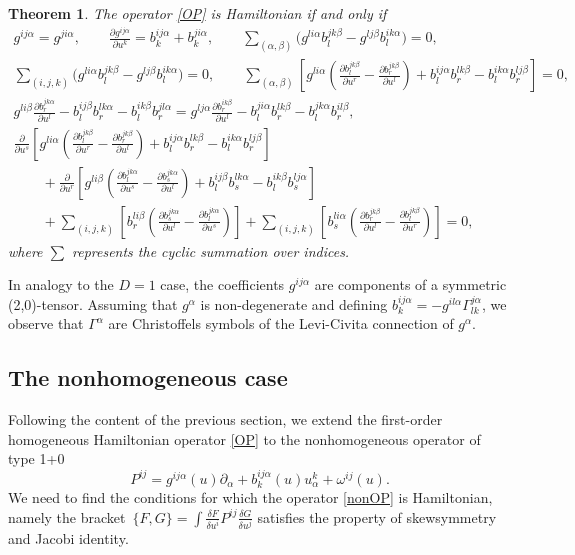 \documentclass[pdftex]{sigma}
\numberwithin{equation}{section}
\newtheorem{Theorem}{Theorem}[section]
\begin{document}
\begin{Theorem}
The operator \eqref{OP} is Hamiltonian if and only if
\begin{gather}
 g^{ij\alpha}=g^{ji\alpha},\qquad
 \frac{\partial g^{ij\alpha}}{\partial u^k}=b^{ij\alpha}_k+b^{ji\alpha}_k,\qquad
 \sum_{(\alpha,\beta)}\big(g^{li\alpha}b^{jk\beta}_l-g^{lj\beta}b^{ik\alpha}_l\big)=0,\nonumber\\
 \sum_{(i,j,k)}\big(g^{li\alpha}b^{jk\beta}_l-g^{lj\beta}b^{ik\alpha}_l\big)=0,\qquad
 \sum_{(\alpha,\beta)}\left[g^{li\alpha}\left(\frac{\partial b^{jk\beta}_l}{\partial u^r}-\frac{\partial b^{jk\beta}_r}{\partial u^l} \right)+b^{ij\alpha}_lb^{lk\beta}_r-b^{ik\alpha}_lb^{lj\beta}_r\right]=0,\nonumber\\
 g^{li\beta}\frac{\partial b^{jk\alpha}_r}{\partial u^l}-b^{ij\beta}_lb^{lk\alpha}_r-b^{ik\beta}_lb^{jl\alpha}_r=g^{lj\alpha}\frac{\partial b^{ik\beta}_r}{\partial u^l}-b^{ji\alpha}_lb^{lk\beta}_r-b^{jk\alpha}_lb^{il\beta}_r,\nonumber\\
 \frac{\partial}{\partial u^s}\left[g^{li\alpha}\left(\frac{\partial b^{jk\beta}_l}{\partial u^r}-\frac{\partial b^{jk\beta}_r}{\partial u^l}\right)+b^{ij\alpha}_lb^{lk\beta}_r-b^{ik\alpha}_lb^{lj\beta}_r\right] \nonumber \\
 \qquad+\frac{\partial}{\partial u^r}\left[g^{li\beta}\left(\frac{\partial b^{jk\alpha}_l}{\partial u^s}-\frac{\partial b^{jk\alpha}_s}{\partial u^l}\right)+b^{ij\beta}_lb^{lk\alpha}_s-b^{ik\beta}_lb^{lj\alpha}_s\right] \nonumber \\
\qquad +\sum_{(i,j,k)}\left[b^{li\beta}_r\left(\frac{\partial b^{jk\alpha}_s}{\partial u^l}-\frac{\partial b^{jk\alpha}_l}{\partial u^s}\right)\right] +\sum_{(i,j,k)}\left[b^{li\alpha}_s\left(\frac{\partial b^{jk\beta}_r}{\partial u^l}-\frac{\partial b^{jk\beta}_l}{\partial u^r}\right)\right]=0,\label{con1}
\end{gather}
where $\sum$ represents the cyclic summation over indices.
\end{Theorem}

In analogy to the $D=1$ case, the coefficients $g^{ij\alpha}$ are components of a symmetric (2,0)-tensor. Assuming that $g^\alpha$ is non-degenerate and defining $b^{ij\alpha}_k=-g^{il\alpha}\Gamma^{j\alpha}_{lk}$, we observe that $\Gamma^\alpha$ are Christoffels symbols of the Levi-Civita connection of $g^\alpha$.

\subsection {The nonhomogeneous case}
Following the content of the previous section, we extend the first-order homogeneous Hamiltonian operator \eqref{OP} to the nonhomogeneous operator of type 1+0
\begin{equation}\label{nonOP}
P^{ij}=g^{ij\alpha}(u)\partial_\alpha+b^{ij\alpha}_k(u)u^k_\alpha+\omega^{ij}(u).
\end{equation}
We need to find the conditions for which the operator \eqref{nonOP} is Hamiltonian, namely the brack\-et~${\lbrace F,G\rbrace=\int \frac{\delta F}{\delta u^i}P^{ij}\frac{\delta G}{\delta u^j}}$ satisfies the property of skewsymmetry and Jacobi identity.
\end{document}
